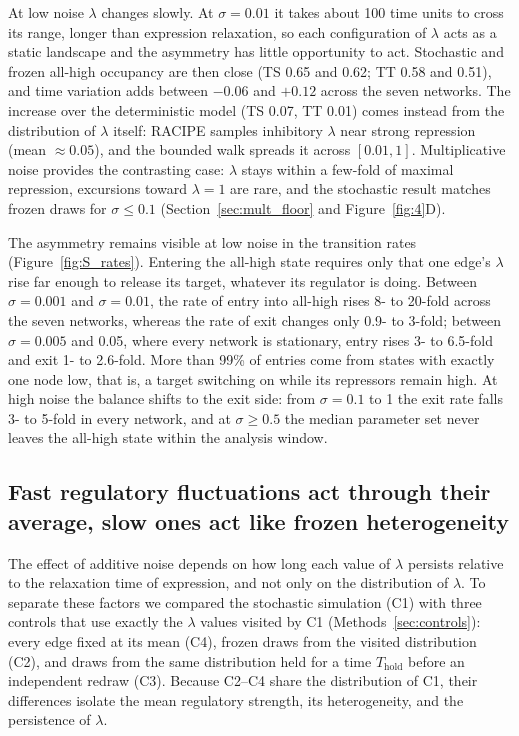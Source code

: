 \documentclass[11pt]{article}
\begin{document}
At low noise $\lambda$ changes slowly. At $\sigma = 0.01$ it takes about 100 time units to cross its range, longer than expression relaxation, so each configuration of $\lambda$ acts as a static landscape and the asymmetry has little opportunity to act. Stochastic and frozen all-high occupancy are then close (TS 0.65 and 0.62; TT 0.58 and 0.51), and time variation adds between $-0.06$ and $+0.12$ across the seven networks. The increase over the deterministic model (TS 0.07, TT 0.01) comes instead from the distribution of $\lambda$ itself: RACIPE samples inhibitory $\lambda$ near strong repression (mean $\approx 0.05$), and the bounded walk spreads it across $[0.01, 1]$. Multiplicative noise provides the contrasting case: $\lambda$ stays within a few-fold of maximal repression, excursions toward $\lambda = 1$ are rare, and the stochastic result matches frozen draws for $\sigma \leq 0.1$ (Section~\ref{sec:mult_floor} and Figure~\ref{fig:4}D).

The asymmetry remains visible at low noise in the transition rates (Figure~\ref{fig:S_rates}). Entering the all-high state requires only that one edge's $\lambda$ rise far enough to release its target, whatever its regulator is doing. Between $\sigma = 0.001$ and $\sigma = 0.01$, the rate of entry into all-high rises 8- to 20-fold across the seven networks, whereas the rate of exit changes only 0.9- to 3-fold; between $\sigma = 0.005$ and 0.05, where every network is stationary, entry rises 3- to 6.5-fold and exit 1- to 2.6-fold. More than 99\% of entries come from states with exactly one node low, that is, a target switching on while its repressors remain high. At high noise the balance shifts to the exit side: from $\sigma = 0.1$ to 1 the exit rate falls 3- to 5-fold in every network, and at $\sigma \geq 0.5$ the median parameter set never leaves the all-high state within the analysis window.

\subsection{Fast regulatory fluctuations act through their average, slow ones act like frozen heterogeneity} \label{sec:timescale}
The effect of additive noise depends on how long each value of $\lambda$ persists relative to the relaxation time of expression, and not only on the distribution of $\lambda$. To separate these factors we compared the stochastic simulation (C1) with three controls that use exactly the $\lambda$ values visited by C1 (Methods~\ref{sec:controls}): every edge fixed at its mean (C4), frozen draws from the visited distribution (C2), and draws from the same distribution held for a time $T_\text{hold}$ before an independent redraw (C3). Because C2--C4 share the distribution of C1, their differences isolate the mean regulatory strength, its heterogeneity, and the persistence of $\lambda$.
\end{document}
